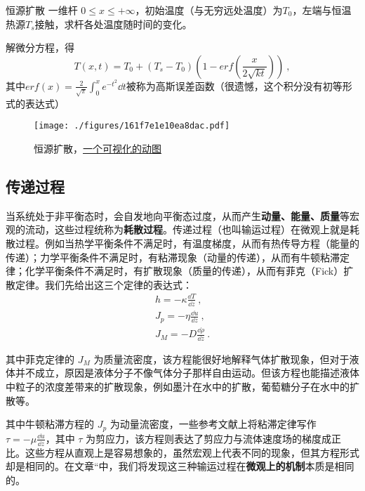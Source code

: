 \begin{example}{恒源扩散}
一维杆 $0\le x\le +\infty$，初始温度（与无穷远处温度）为$T_0$，左端与恒温热源$T_s$接触，求杆各处温度随时间的变化。

解微分方程，得
\begin{equation}
T(x,t)=T_0+(T_s-T_0)\left(1-erf\left(\frac{x}{2\sqrt{kt}}\right)\right)~,
\end{equation}
其中$erf(x)=\frac{2}{\sqrt{\pi}}\int^x_0 e^{-t^2} \dd t$被称为高斯误差函数（很遗憾，这个积分没有初等形式的表达式）

\begin{figure}[ht]
\centering
\texttt{[image: ./figures/161f7e1e10ea8dac.pdf]}
\caption{恒源扩散，\href{https://wuli.wiki/apps/diffus.html}{一个可视化的动图}} \label{fig_heatc_1}
\end{figure}
\end{example}

\subsection{传递过程}
当系统处于非平衡态时，会自发地向平衡态过度，从而产生\textbf{动量、能量、质量}等宏观的流动，这些过程统称为\textbf{耗散过程}。传递过程（也叫输运过程）在微观上就是耗散过程。例如当热学平衡条件不满足时，有温度梯度，从而有热传导方程（能量的传递）；力学平衡条件不满足时，有粘滞现象（动量的传递），从而有牛顿粘滞定律；化学平衡条件不满足时，有扩散现象（质量的传递），从而有菲克（Fick）扩散定律。我们先给出这三个定律的表达式：
\begin{align}
h=-\kappa \frac{\dd T}{\dd z}~,\\
J_p=-\eta \frac{\dd u}{\dd z}~,\\
J_M=-D\frac{\dd \rho}{\dd z}~.
\end{align}

其中菲克定律的 $J_M$ 为质量流密度，该方程能很好地解释气体扩散现象，但对于液体并不成立，原因是液体分子不像气体分子那样自由运动。但该方程也能描述液体中粒子的浓度差带来的扩散现象，例如墨汁在水中的扩散，葡萄糖分子在水中的扩散等。

其中牛顿粘滞方程的 $J_p$ 为动量流密度，一些参考文献上将粘滞定律写作 $\tau = -\mu \frac{\dd u}{\dd z}$，其中 $\tau$ 为剪应力，该方程则表达了剪应力与流体速度场的梯度成正比。这些方程从直观上是容易想象的，虽然宏观上代表不同的现象，但其方程形式却是相同的。在文章“中，我们将发现这三种输运过程在\textbf{微观上的机制}本质是相同的。

